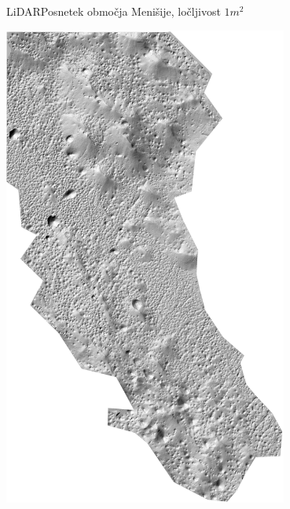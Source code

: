 \documentclass{beamer}
\begin{document}
\begin{frame}{LiDAR}{Posnetek območja Menišije, ločljivost $1m^2$}
\begin{center}
  \hspace*{-0.95cm}\includegraphics[width=0.7\textwidth,angle=90]{slike/menisija-relief}
\end{center}
\end{frame}
\end{document}
